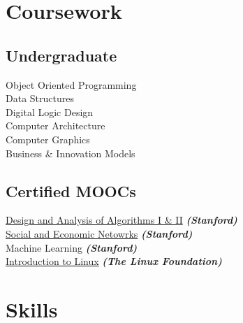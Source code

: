 \documentclass[]{deedy-resume-openfont}
\begin{document}
\begin{minipage}[t]{0.33\textwidth}

\section{Coursework}

\subsection{Undergraduate}
Object Oriented Programming \\
Data Structures \\
Digital Logic Design \\
Computer Architecture \\
Computer Graphics \\
Business & Innovation Models \\
\sectionsep

\subsection{Certified MOOCs}
\href{https://www.coursera.org/account/accomplishments/verify/46LSPVQ5BE8U}{Design and Analysis of Algorithms I \& II} {\footnotesize \textit{\textbf{(Stanford) }}} \\
\href{https://www.coursera.org/account/accomplishments/verify/46LSPVQ5BE8U}{Social and Economic Netowrks} {\footnotesize \textit{\textbf{(Stanford) }}} \\
Machine Learning {\footnotesize \textit{\textbf{(Stanford) }}} \\
\href{https://s3.amazonaws.com/verify.edx.org/downloads/e569b9c2162448468926c8629e7ce35b/Certificate.pdf}{Introduction to Linux} {\footnotesize \textit{\textbf{(The Linux Foundation) }}}
\sectionsep



\section{Skills}

\end{minipage}
\end{document}
